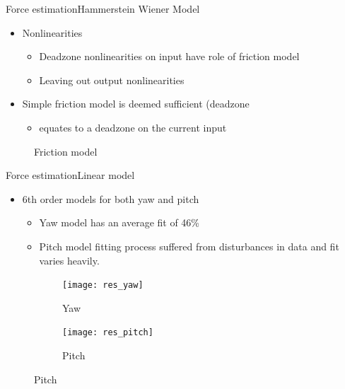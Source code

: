 \begin{frame}{Force estimation}{Hammerstein Wiener Model}
\begin{itemize}
  \item Nonlinearities
  \begin{itemize}
    \item Deadzone nonlinearities on input have role of friction model
    \item Leaving out output nonlinearities
  \end{itemize}  
  \item Simple friction model is deemed sufficient (deadzone
  \begin{itemize}
  \item equates to a deadzone on the current input
  \end{itemize}
\end{itemize}
\begin{figure}[h]
\centering
\caption{Friction model}
\label{fig:new_friction_model}
\end{figure}
\end{frame}

\begin{frame}{Force estimation}{Linear model}
\begin{itemize}
\item 6th order models for both yaw and pitch
\begin{itemize}
\item Yaw model has an average fit of 46\%
\item Pitch model fitting process suffered from disturbances in data and fit varies heavily.
\end{itemize}
\end{itemize}
\begin{figure}
\centering
    \begin{subfigure}[t]{0.49\textwidth}
        \centering
        \texttt{[image: res\_yaw]} 
        \caption{Yaw} \label{fig:yawres}
    \end{subfigure}
        \begin{subfigure}[t]{0.49\textwidth}
        \centering
        \texttt{[image: res\_pitch]} 
        \caption{Pitch} \label{fig:pitchres}
    \end{subfigure}
\end{figure}
\end{frame}

